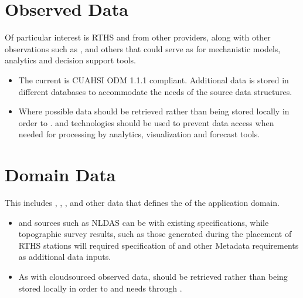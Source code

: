 \documentclass[letterpaper,10pt,english]{sphinxmanual}
\begin{document}
\section{Observed Data}
\label{\detokenize{requirements/data/observed:observed-data}}\label{\detokenize{requirements/data/observed::doc}}
\sphinxAtStartPar
Of particular interest is RTHS and  from other providers, along with other observations such as ,  and others that could serve as  for mechanistic models, analytics and decision support tools.
\begin{itemize}
\item {} 
\sphinxAtStartPar
The current  is CUAHSI ODM 1.1.1 compliant. Additional data is stored in different databases to accommodate the needs of the source data structures.

\item {} 
\sphinxAtStartPar
Where possible  data should be retrieved  rather than being stored locally in order to .  and  technologies should be used to prevent data access  when needed for processing by analytics, visualization and forecast tools.

\end{itemize}


\section{Domain Data}
\label{\detokenize{requirements/data/domain:domain-data}}\label{\detokenize{requirements/data/domain::doc}}
\sphinxAtStartPar
This includes , , ,
 and other data that defines the  of the
application domain.
\begin{itemize}
\item {} 
\sphinxAtStartPar
{} and  sources such as NLDAS can be  with existing  specifications, while topographic survey results, such as those generated during the placement of RTHS stations will required specification of  and other Metadata requirements as additional data inputs.

\item {} 
\sphinxAtStartPar
As with cloud\sphinxhyphen{}sourced observed data,  should be retrieved  rather than being stored locally in order to  and  needs through .

\end{itemize}
\end{document}
